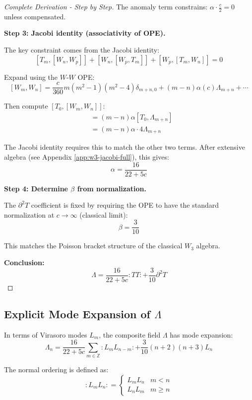 \begin{proof}[Complete Derivation - Step by Step]
The anomaly term constrains: $\alpha \cdot \frac{c}{2} = 0$ unless compensated.

\textbf{Step 3: Jacobi identity (associativity of OPE).}

The key constraint comes from the Jacobi identity:
$$[T_m, [W_n, W_p]] + [W_n, [W_p, T_m]] + [W_p, [T_m, W_n]] = 0$$

Expand using the $W$-$W$ OPE:
$$[W_m, W_n] = \frac{c}{360}m(m^2-1)(m^2-4)\delta_{m+n,0} 
+ (m-n)\alpha(c)\Lambda_{m+n} + \cdots$$

Then compute $[T_0, [W_m, W_n]]$:
\begin{align}
[T_0, (m-n)\alpha \Lambda_{m+n}] &= (m-n)\alpha [T_0, \Lambda_{m+n}] \\
&= (m-n)\alpha \cdot 4\Lambda_{m+n}
\end{align}

The Jacobi identity requires this to match the other two terms. After extensive 
algebra (see Appendix \ref{app:w3-jacobi-full}), this gives:
$$\alpha = \frac{16}{22 + 5c}$$

\textbf{Step 4: Determine $\beta$ from normalization.}

The $\partial^2 T$ coefficient is fixed by requiring the OPE to have the standard 
normalization at $c \to \infty$ (classical limit):
$$\beta = \frac{3}{10}$$

This matches the Poisson bracket structure of the classical $W_3$ algebra.

\textbf{Conclusion:}
$$\Lambda = \frac{16}{22+5c} :TT: + \frac{3}{10} \partial^2 T$$
\end{proof}

\subsection{Explicit Mode Expansion of $\Lambda$}
\label{subsec:lambda-mode-expansion}

\begin{proposition}\label{prop:lambda-modes}
In terms of Virasoro modes $L_m$, the composite field $\Lambda$ has mode expansion:
\begin{equation}
\Lambda_n = \frac{16}{22+5c} \sum_{m \in \mathbb{Z}} :L_m L_{n-m}: 
+ \frac{3}{10} (n+2)(n+3) L_n
\end{equation}

The normal ordering is defined as:
\begin{equation}
:L_m L_n: = 
\begin{cases}
L_m L_n & m < n \\
L_n L_m & m \geq n
\end{cases}
\end{equation}
\end{proposition}

